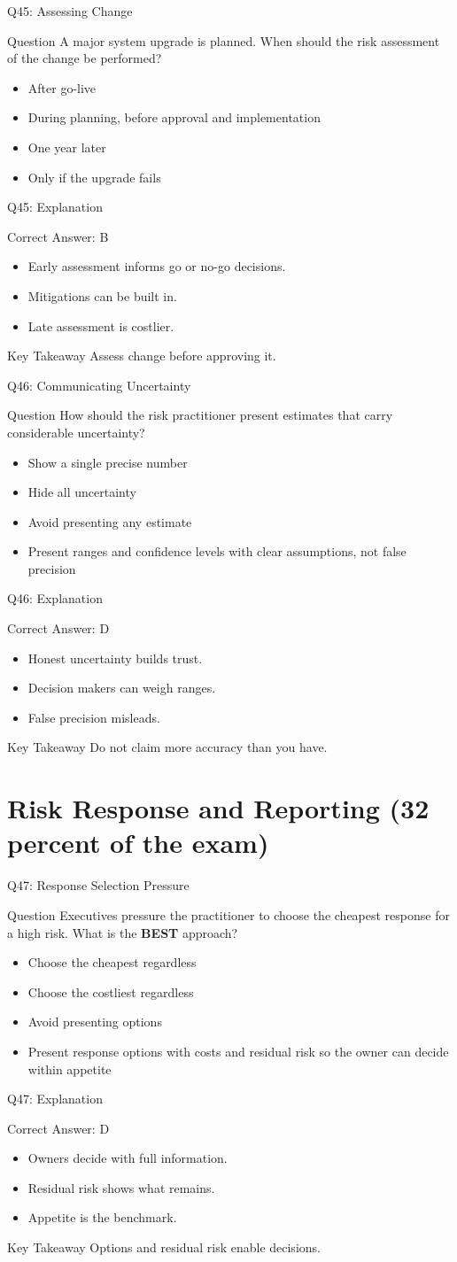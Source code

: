 \documentclass[aspectratio=169]{beamer}
\newcommand{\hq}[7]{%
	\begin{frame}{Q#1: #2}
		\begin{block}{Question}
			#3
		\end{block}
		\begin{itemize}
			#4
		\end{itemize}
	\end{frame}
	\begin{frame}{Q#1: Explanation}
		\begin{block}{Correct Answer: #5}
			\begin{itemize}
				#6
			\end{itemize}
		\end{block}
		\begin{alertblock}{Key Takeaway}
			#7
		\end{alertblock}
	\end{frame}
}
\begin{document}
	\hq{45}{Assessing Change}
	{A major system upgrade is planned. When should the risk assessment of the change be performed?}
	{\item[\textbf{(A)}] After go-live
		\item[\textbf{(B)}] During planning, before approval and implementation
		\item[\textbf{(C)}] One year later
		\item[\textbf{(D)}] Only if the upgrade fails}
	{B}
	{\item Early assessment informs go or no-go decisions.
		\item Mitigations can be built in.
		\item Late assessment is costlier.}
	{Assess change before approving it.}
	
	\hq{46}{Communicating Uncertainty}
	{How should the risk practitioner present estimates that carry considerable uncertainty?}
	{\item[\textbf{(A)}] Show a single precise number
		\item[\textbf{(B)}] Hide all uncertainty
		\item[\textbf{(C)}] Avoid presenting any estimate
		\item[\textbf{(D)}] Present ranges and confidence levels with clear assumptions, not false precision}
	{D}
	{\item Honest uncertainty builds trust.
		\item Decision makers can weigh ranges.
		\item False precision misleads.}
	{Do not claim more accuracy than you have.}
	
	\section{Risk Response and Reporting (32 percent of the exam)}
	
	\hq{47}{Response Selection Pressure}
	{Executives pressure the practitioner to choose the cheapest response for a high risk. What is the \textbf{BEST} approach?}
	{\item[\textbf{(A)}] Choose the cheapest regardless
		\item[\textbf{(B)}] Choose the costliest regardless
		\item[\textbf{(C)}] Avoid presenting options
		\item[\textbf{(D)}] Present response options with costs and residual risk so the owner can decide within appetite}
	{D}
	{\item Owners decide with full information.
		\item Residual risk shows what remains.
		\item Appetite is the benchmark.}
	{Options and residual risk enable decisions.}
	
\end{document}
